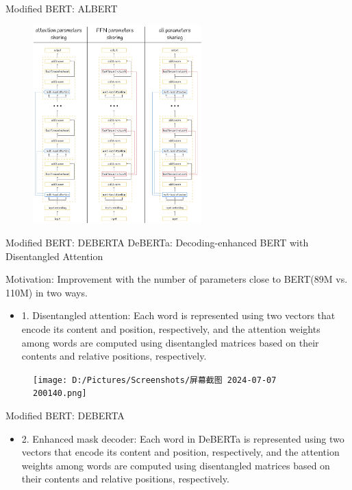 \documentclass{beamer}
\begin{document}
\begin{frame}{Modified BERT: ALBERT}
  \begin{figure}[H]
    \centering
    \includegraphics[width=6.5cm]{pictures/albert3.png}
  \end{figure}
\end{frame}
\begin{frame}{Modified BERT: DEBERTA}
DeBERTa: Decoding-enhanced BERT with Disentangled Attention\cite{he2021debertadecodingenhancedbertdisentangled}

Motivation: Improvement with the number of parameters close to BERT(89M vs. 110M) in two ways.
\begin{itemize}
  \item 1. Disentangled attention: Each word is represented using two vectors that encode its content and position, respectively, and the
  attention weights among words are computed using disentangled matrices based on their contents
  and relative positions, respectively. 
\end{itemize}
  \begin{figure}[H]
    \centering
    \texttt{[image: D:/Pictures/Screenshots/屏幕截图 2024-07-07 200140.png]}
  \end{figure}
\end{frame}
\begin{frame}{Modified BERT: DEBERTA}
  \begin{itemize}
    \item 2. Enhanced mask decoder: Each word in
    DeBERTa is represented using two vectors that encode its content and position, respectively, and the
    attention weights among words are computed using disentangled matrices based on their contents
    and relative positions, respectively. 
   \end{itemize} 
  \end{frame}
\end{document}
